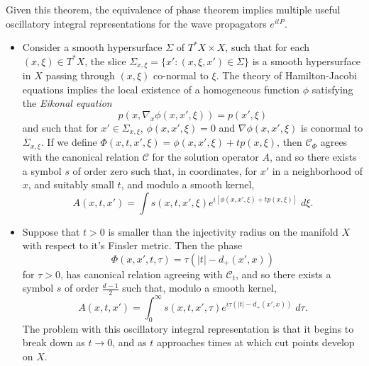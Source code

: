 Given this theorem, the equivalence of phase theorem implies multiple useful oscillatory integral representations for the wave propagators $e^{i t P}$.
\begin{itemize}
  \item Consider a smooth hypersurface $\Sigma$ of $T^* X \times X$, such that for each $(x,\xi) \in T^* X$, the slice $\Sigma_{x,\xi} = \{ x' : (x,\xi,x') \in \Sigma \}$ is a smooth hypersurface in $X$ passing through $(x,\xi)$ co-normal to $\xi$. The theory of Hamilton-Jacobi equations implies the local existence of a homogeneous function $\phi$ satisfying the \emph{Eikonal equation}
  \begin{equation} \label{awiodjawoidhjioq23412341234234}
    p(x, \nabla_x \phi(x,x',\xi)) = p(x',\xi)
  \end{equation}
  and such that for $x' \in \Sigma_{x,\xi}$, $\phi(x,x',\xi) = 0$ and $\nabla \phi(x,x',\xi)$ is conormal to $\Sigma_{x,\xi}$. If we define $\Phi(x,t,x',\xi) = \phi(x,x',\xi) + t p(x,\xi)$, then $\mathcal{C}_\Phi$ agrees with the canonical relation $\mathcal{C}$ for the solution operator $A$, and so there exists a symbol $s$ of order zero such that, in coordinates, for $x'$ in a neighborhood of $x$, and suitably small $t$, and modulo a smooth kernel,
  \begin{equation} A(x,t,x') = \int s(x,t,x',\xi) e^{i [ \phi(x,x',\xi) + t p(x,\xi) ]}\; d \xi. \end{equation}

  \item Suppose that $t > 0$ is smaller than the injectivity radius on the manifold $X$ with respect to it's Finsler metric. Then the phase 
  \begin{equation} \label{onedwavephase}
    \Phi(x,x',t,\tau) = \tau ( |t| - d_+(x',x) )
  \end{equation}
  for $\tau > 0$, has canonical relation agreeing with $\mathcal{C}_t$, and so there exists a symbol $s$ of order $\tfrac{d-1}{2}$ such that, modulo a smooth kernel,
  \begin{equation}
    A(x,t,x') = \int_0^\infty s(x,t,x',\tau) e^{i \tau ( |t| - d_+(x',x) )}\; d\tau.
  \end{equation}
  The problem with this oscillatory integral representation is that it begins to break down as $t \to 0$, and as $t$ approaches times at which cut points develop on $X$.


\end{itemize}
